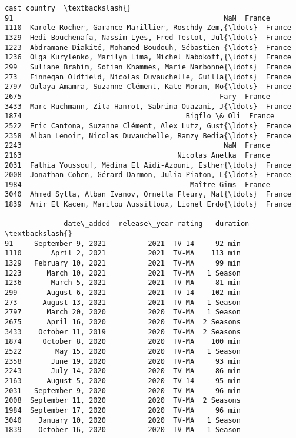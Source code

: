 \documentclass[11pt]{article}
\begin{document}
\begin{tcolorbox}[breakable, size=fbox, boxrule=.5pt, pad at break*=1mm, opacityfill=0]
\begin{Verbatim}[commandchars=\\\{\}]
                                                   cast country  \textbackslash{}
91                                                  NaN  France
1110  Karole Rocher, Garance Marillier, Roschdy Zem,{\ldots}  France
1329  Hedi Bouchenafa, Nassim Lyes, Fred Testot, Jul{\ldots}  France
1223  Abdramane Diakité, Mohamed Boudouh, Sébastien {\ldots}  France
1236  Olga Kurylenko, Marilyn Lima, Michel Nabokoff,{\ldots}  France
299   Suliane Brahim, Sofian Khammes, Marie Narbonne{\ldots}  France
273   Finnegan Oldfield, Nicolas Duvauchelle, Guilla{\ldots}  France
2797  Oulaya Amamra, Suzanne Clément, Kate Moran, Mo{\ldots}  France
2675                                               Fary  France
3433  Marc Ruchmann, Zita Hanrot, Sabrina Ouazani, J{\ldots}  France
1874                                       Bigflo \& Oli  France
2522  Eric Cantona, Suzanne Clément, Alex Lutz, Gust{\ldots}  France
2358  Alban Lenoir, Nicolas Duvauchelle, Ramzy Bedia{\ldots}  France
2243                                                NaN  France
2163                                     Nicolas Anelka  France
2031  Fathia Youssouf, Médina El Aidi-Azouni, Esther{\ldots}  France
2008  Jonathan Cohen, Gérard Darmon, Julia Piaton, L{\ldots}  France
1984                                        Maître Gims  France
3040  Ahmed Sylla, Alban Ivanov, Ornella Fleury, Nat{\ldots}  France
1839  Amir El Kacem, Marilou Aussilloux, Lionel Erdo{\ldots}  France

              date\_added  release\_year rating   duration  \textbackslash{}
91     September 9, 2021          2021  TV-14     92 min
1110       April 2, 2021          2021  TV-MA    113 min
1329   February 10, 2021          2021  TV-MA     99 min
1223      March 10, 2021          2021  TV-MA   1 Season
1236       March 5, 2021          2021  TV-MA     81 min
299       August 6, 2021          2021  TV-14    102 min
273      August 13, 2021          2021  TV-MA   1 Season
2797      March 20, 2020          2020  TV-MA   1 Season
2675      April 16, 2020          2020  TV-MA  2 Seasons
3433    October 11, 2019          2020  TV-MA  2 Seasons
1874     October 8, 2020          2020  TV-MA    100 min
2522        May 15, 2020          2020  TV-MA   1 Season
2358       June 19, 2020          2020  TV-MA     93 min
2243       July 14, 2020          2020  TV-MA     86 min
2163      August 5, 2020          2020  TV-14     95 min
2031   September 9, 2020          2020  TV-MA     96 min
2008  September 11, 2020          2020  TV-MA  2 Seasons
1984  September 17, 2020          2020  TV-MA     96 min
3040    January 10, 2020          2020  TV-MA   1 Season
1839    October 16, 2020          2020  TV-MA   1 Season


\end{Verbatim}
\end{tcolorbox}
\end{document}
